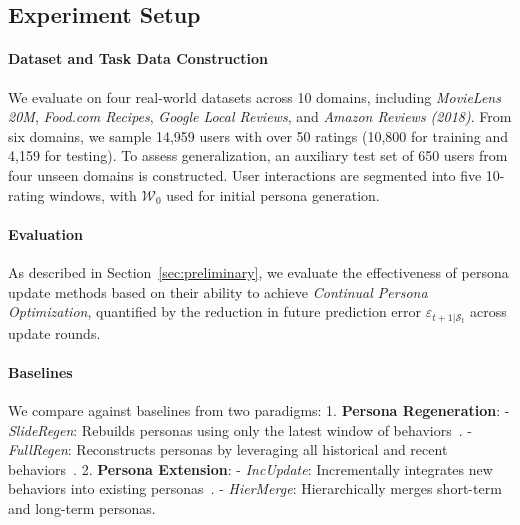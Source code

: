 

\subsection{Experiment Setup}


\paragraph{Dataset and Task Data Construction}  
We evaluate \method on four real-world datasets across 10 domains, including \textit{MovieLens 20M}\cite{harper2015movielens}, \textit{Food.com Recipes}\cite{majumder2019generating}, \textit{Google Local Reviews}\cite{yan2023personalized,li2022uctopic}, and \textit{Amazon Reviews (2018)}\cite{ni2019justifying}. From six domains, we sample 14,959 users with over 50 ratings (10,800 for training and 4,159 for testing). To assess generalization, an auxiliary test set of 650 users from four unseen domains is constructed. User interactions are segmented into five 10-rating windows, with $\mathcal{W}_0$ used for initial persona generation.

\paragraph{Evaluation} 
As described in Section~\ref{sec:preliminary}, we evaluate the effectiveness of persona update methods based on their ability to achieve \textit{Continual Persona Optimization}, quantified by the reduction in future prediction error $\varepsilon_{t+1|\mathcal{S}_t}$ across update rounds.



\paragraph{Baselines}
We compare against baselines from two paradigms:
1. \textbf{Persona Regeneration}:  
   - \textit{SlideRegen}: Rebuilds personas using only the latest window of behaviors~\cite{yang2023palr}.
   - \textit{FullRegen}: Reconstructs personas by leveraging all historical and recent behaviors~\cite{zhou2024language}.
2. \textbf{Persona Extension}: 
   - \textit{IncUpdate}: Incrementally integrates new behaviors into existing personas~\cite{yuan2024evaluating}. 
   - \textit{HierMerge}\cite{liu2024once}: Hierarchically merges short-term and long-term personas.

